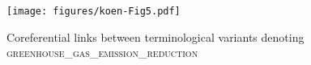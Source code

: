 \documentclass[output=paper]{langsci/langscibook.cls}
\begin{document}
\begin{figure}
	

\texttt{[image: figures/koen-Fig5.pdf]}


\caption{Coreferential links between terminological variants denoting \textsc{greenhouse\_gas\_emission\_reduction}}
\label{fig:3}
\end{figure}
\end{document}
